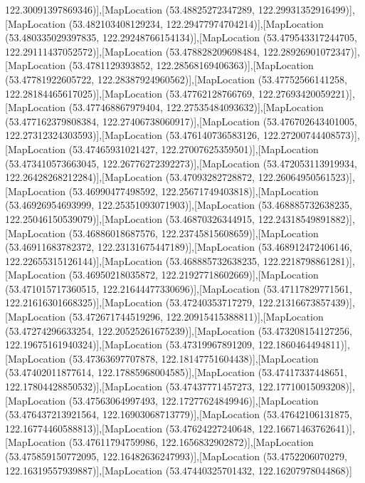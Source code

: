 122.30091397869346)],[MapLocation (53.48825272347289, 122.29931352916499)],[MapLocation (53.482103408129234, 122.29477974704214)],[MapLocation (53.480335029397835, 122.29248766154134)],[MapLocation (53.479543317244705, 122.29111437052572)],[MapLocation (53.478828209698484, 122.28926901072347)],[MapLocation (53.4781129393852, 122.28568169406363)],[MapLocation (53.47781922605722, 122.28387924960562)],[MapLocation (53.47752566141258, 122.28184465617025)],[MapLocation (53.47762128766769, 122.27693420059221)],[MapLocation (53.477468867979404, 122.27535484093632)],[MapLocation (53.477162379808384, 122.27406738060917)],[MapLocation (53.476702643401005, 122.27312324303593)],[MapLocation (53.476140736583126, 122.27200744408573)],[MapLocation (53.47465931021427, 122.27007625359501)],[MapLocation (53.473410573663045, 122.26776272392273)],[MapLocation (53.472053113919934, 122.26428268212284)],[MapLocation (53.47093282728872, 122.26064950561523)],[MapLocation (53.46990477498592, 122.25671749403818)],[MapLocation (53.46926954693999, 122.25351093071903)],[MapLocation (53.468885732638235, 122.25046150539079)],[MapLocation (53.46870326344915, 122.24318549891882)],[MapLocation (53.46886018687576, 122.23745815608659)],[MapLocation (53.46911683782372, 122.23131675447189)],[MapLocation (53.468912472406146, 122.22655315126144)],[MapLocation (53.468885732638235, 122.2218798861281)],[MapLocation (53.46950218035872, 122.21927718602669)],[MapLocation (53.471015717360515, 122.21644477330696)],[MapLocation (53.47117829771561, 122.21616301668325)],[MapLocation (53.47240353717279, 122.21316673857439)],[MapLocation (53.472671744519296, 122.20915415388811)],[MapLocation (53.47274296633254, 122.20525261675239)],[MapLocation (53.473208154127256, 122.19675161940324)],[MapLocation (53.47319967891209, 122.1860464494811)],[MapLocation (53.47363697707878, 122.18147751604438)],[MapLocation (53.47402011877614, 122.17885968004585)],[MapLocation (53.47417337448651, 122.17804428850532)],[MapLocation (53.47437771457273, 122.17710015093208)],[MapLocation (53.47563064997493, 122.17277624849946)],[MapLocation (53.476437213921564, 122.16903068713779)],[MapLocation (53.47642106131875, 122.16774460588813)],[MapLocation (53.47624227240648, 122.16671463762641)],[MapLocation (53.47611794759986, 122.1656832902872)],[MapLocation (53.475859150772095, 122.16482636247993)],[MapLocation (53.4752206070279, 122.16319557939887)],[MapLocation (53.47440325701432, 122.16207978044868)]